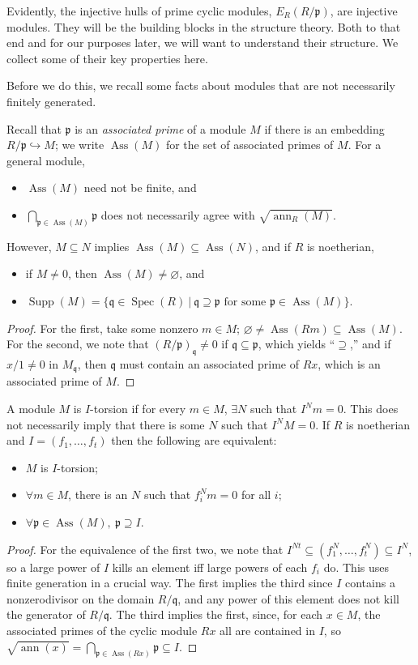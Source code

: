 \documentclass[11pt]{book}
\numberwithin{equation}{section}
\numberwithin{theorem}{chapter}
\theoremstyle{definition}
\newtheorem*{basic properties}{Basic Properties}
\newtheorem*{Important Remark}{Important Remark}
\theoremstyle{remark}
\newcommand{\p}{\mathfrak{p}}
\newcommand{\q}{\mathfrak{q}}
\newcommand{\Spec}{\operatorname{Spec}}
\newcommand{\Ass}{\operatorname{Ass}}
\newcommand{\ann}{\operatorname{ann}}
\DeclareMathOperator{\Supp}{Supp}
\begin{document}
Evidently, the injective hulls of prime cyclic modules, $E_R(R/\p)$, are injective modules. They will be the building blocks in the structure theory. Both to that end and for our purposes later, we will want to understand their structure. We collect some of their key properties here.

Before we do this, we recall some facts about modules that are not necessarily finitely generated.

Recall that $\p$ is an \emph{associated prime}\index{$\Ass(M)$} of a module $M$ if there is an embedding $R/\p\hookrightarrow M$; we write $\Ass(M)$ for the set of associated primes of $M$. For a general module, 
\begin{itemize}
	\item $\Ass(M)$ need not be finite, and
	\item $\bigcap_{\p\in\Ass(M)} \p$ does not necessarily agree with $\sqrt{\ann_R(M)}$.
\end{itemize}
However, $M\subseteq N$ implies $\Ass(M)\subseteq \Ass(N)$, and if $R$ is noetherian,
\begin{itemize}
	\item if $M\neq 0$, then $\Ass(M)\neq \varnothing$, and
	\item $\Supp(M)=\{ \q \in \Spec(R) \ | \ \q \supseteq \p  \text{ for some } \p \in \Ass(M) \}$.
\end{itemize}
\begin{proof}
	For the first, take some nonzero $m\in M$; $\varnothing\neq\Ass(Rm) \subseteq \Ass(M)$. For the second, we note that $(R/\p)_\q \neq 0$ if $\q \subseteq \p$, which yields ``$\supseteq$,'' and if $x/1 \neq 0$ in $M_\q$, then $\q$ must contain an associated prime of $Rx$, which is an associated prime of $M$.
\end{proof}

A module $M$ is $I$-torsion if for every $m\in M$, $\exists N$ such that $I^N m=0$. This does not necessarily imply that there is some $N$ such that $I^N M=0$. If $R$ is noetherian and $I=(f_1,\dots, f_t)$ then the following are equivalent:
\begin{itemize}
	\item $M$ is $I$-torsion;
	\item $\forall m\in M$, there is an $N$ such that $f_i^N m=0$ for all $i$;
	\item $\forall \p \in \Ass(M), \ \p \supseteq I$.
\end{itemize}
\begin{proof}
	For the equivalence of the first two, we note that $I^{Nt}\subseteq (f_1^N,\dots,f_t^N)\subseteq I^N$, so a large power of $I$ kills an element iff large powers of each $f_i$ do. This uses finite generation in a crucial way. The first implies the third since $I$ contains a nonzerodivisor on the domain $R/\q$, and any power of this element does not kill the generator of $R/\q$. The third implies the first, since, for each $x\in M$, the associated primes of the cyclic module $Rx$ all are contained in $I$, so $\sqrt{\ann(x)}=\bigcap_{\p\in \Ass(Rx)} \p \subseteq I$.
\end{proof}
\end{document}
